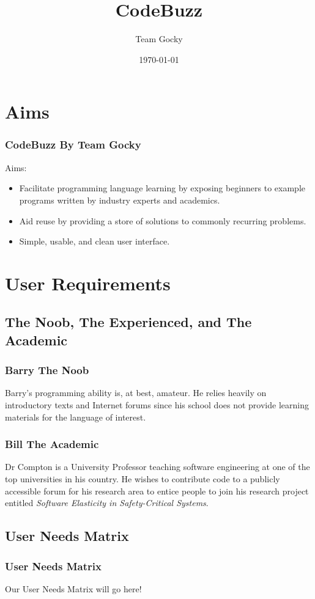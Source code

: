 \documentclass[handout, t]{beamer}
\title[DIM3 Project Presentation]{CodeBuzz}
\author{Team Gocky}
\institute{University Of Glasgow}
\date{\today}
\begin{document}
\section{Aims}

\begin{frame}
\frametitle{CodeBuzz By Team Gocky}
Aims:
\begin{itemize}
\item Facilitate programming language learning by exposing beginners to
example programs written by industry experts and academics.
\item Aid reuse by providing a store of solutions to commonly recurring
problems.
\item Simple, usable, and clean user interface.
\end{itemize}
\end{frame}

\section{User Requirements}

\subsection{The Noob, The Experienced, and The Academic}

\begin{frame}
\frametitle{Barry The Noob}
Barry's programming ability is, at best,
amateur. He relies heavily on introductory texts and Internet forums
since his school does not provide learning materials for the language
of interest.
\end{frame}

\begin{frame}
\frametitle{Bill The Academic}
Dr Compton is a University Professor teaching software engineering at
one of the top universities in his country. He wishes to contribute
code to a publicly accessible forum for his research area to entice
people to join his research project entitled
\textit{Software Elasticity in Safety-Critical Systems}.
\end{frame}

\subsection{User Needs Matrix}

\begin{frame}
\frametitle{User Needs Matrix}
Our User Needs Matrix will go here!
\end{frame}
\end{document}
